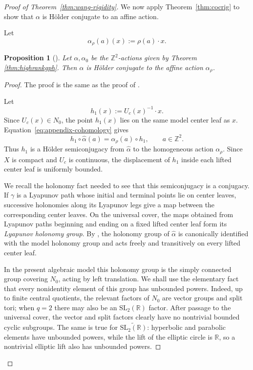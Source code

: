 \documentclass[11pt]{amsart}
\numberwithin{equation}{section}
\newcommand{\Z}{\mathbb{Z}}
\newcommand{\SL}{\mathrm{SL}}
\theoremstyle{plain}
\newtheorem{prop}[thm]{Proposition}
\begin{document}
\begin{proof}[Proof of Theorem~\ref{thm:wang-rigidity}]
We now apply Theorem~\ref{thm:cocrig} to show that $\alpha$ is H\"older conjugate to an affine action.

Let
\[
\alpha_\rho(a)(x):=\rho(a)\cdot x.\]

\begin{prop}[{\cite[Proposition 6.2]{Wang26}}]
    Let $\alpha,\alpha_0$ be the $\Z^2$-actions given by Theorem \ref{thm:highrankgph}. Then $\alpha$ is H\"older conjugate to the affine action $\alpha_\rho$.
\end{prop}
\begin{proof}
The proof is the same as the proof of \cite[Proposition 6.2]{Wang26}.

Let
\[
h_1(x):=U_c(x)^{-1}\cdot x.
\]
Since $U_c(x)\in N_0$, the point $h_1(x)$ lies on the same model center
leaf as $x$.  Equation~\eqref{eq:appendix-cohomology} gives
\begin{equation}\label{eq:h1-semiconjugacy}
h_1\circ\widehat\alpha(a)
=
\alpha_\rho(a)\circ h_1,
\qquad a\in\mathbb Z^2.
\end{equation}
Thus $h_1$ is a H\"older semiconjugacy from $\widehat\alpha$ to the
homogeneous action $\alpha_\rho$.  Since $X$ is compact and $U_c$ is
continuous, the displacement of $h_1$ inside each lifted center leaf is
uniformly bounded.

We recall the holonomy fact needed to see that this semiconjugacy is a
conjugacy.  If $\gamma$ is a Lyapunov path whose initial and terminal
points lie on center leaves, successive holonomies along its Lyapunov legs
give a map between the corresponding center leaves.  On the universal
cover, the maps obtained from Lyapunov paths beginning and ending on a
fixed lifted center leaf form its \emph{Lyapunov holonomy group}.
By \cite[Propositions~6.6 and~6.8]{Wang26}, the holonomy group of
$\widehat\alpha$ is canonically identified with the model holonomy group
and acts freely and transitively on every lifted center leaf.

In the present algebraic model this holonomy group is the simply connected
group covering $N_0$, acting by left translation.  We shall use the
elementary fact that every nonidentity element of this group has unbounded
powers.  Indeed, up to finite central quotients, the relevant factors of
$N_0$ are vector groups and split tori; when $q=2$ there may also be an
$\SL_2(\mathbb R)$ factor.  After passage to the universal cover, the
vector and split factors clearly have no nontrivial bounded cyclic
subgroups.  The same is true for
$\widetilde{\SL_2(\mathbb R)}$: hyperbolic and parabolic elements have
unbounded powers, while the lift of the elliptic circle is $\mathbb R$,
so a nontrivial elliptic lift also has unbounded powers.


\end{proof}
\end{proof}
\end{document}

